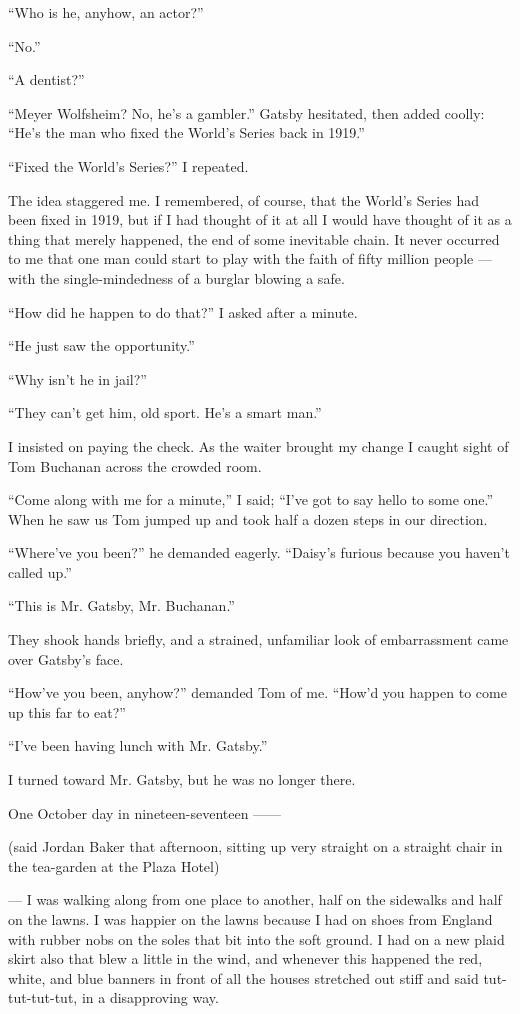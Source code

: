 \documentclass{znotebook}
\begin{document}
``Who is he, anyhow, an actor?''

``No.''

``A dentist?''

``Meyer Wolfsheim? No, he's a gambler.'' Gatsby hesitated, then added coolly: ``He's the man who fixed the World's Series back in 1919.''

``Fixed the World's Series?'' I repeated.

The idea staggered me. I remembered, of course, that the World's Series had been fixed in 1919, but if I had thought of it at all I would have thought of it as a thing that merely happened, the end of some inevitable chain. It never occurred to me that one man could start to play with the faith of fifty million people — with the single-mindedness of a burglar blowing a safe.

``How did he happen to do that?'' I asked after a minute.

``He just saw the opportunity.''

``Why isn't he in jail?''

``They can't get him, old sport. He's a smart man.''

I insisted on paying the check. As the waiter brought my change I caught sight of Tom Buchanan across the crowded room.

``Come along with me for a minute,'' I said; ``I've got to say hello to some one.'' When he saw us Tom jumped up and took half a dozen steps in our direction.

``Where've you been?'' he demanded eagerly. ``Daisy's furious because you haven't called up.''

``This is Mr. Gatsby, Mr. Buchanan.''

They shook hands briefly, and a strained, unfamiliar look of embarrassment came over Gatsby's face.

``How've you been, anyhow?'' demanded Tom of me. ``How'd you happen to come up this far to eat?''

``I've been having lunch with Mr. Gatsby.''

I turned toward Mr. Gatsby, but he was no longer there.

One October day in nineteen-seventeen ——

(said Jordan Baker that afternoon, sitting up very straight on a straight chair in the tea-garden at the Plaza Hotel)

— I was walking along from one place to another, half on the sidewalks and half on the lawns. I was happier on the lawns because I had on shoes from England with rubber nobs on the soles that bit into the soft ground. I had on a new plaid skirt also that blew a little in the wind, and whenever this happened the red, white, and blue banners in front of all the houses stretched out stiff and said tut-tut-tut-tut, in a disapproving way.
\end{document}
